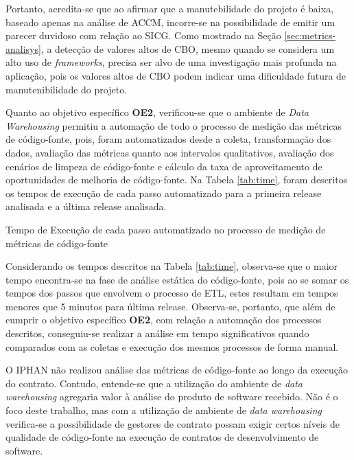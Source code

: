 Portanto, acredita-se que ao afirmar que a manutebilidade do projeto é baixa, baseado apenas na análise de ACCM, incorre-se na possibilidade de emitir um parecer duvidoso com relação ao SICG. Como mostrado na Seção \ref{sec:metrics-analisys}, a detecção de valores altos de CBO, mesmo quando se considera um alto uso de \textit{frameworks}, precisa ser alvo de uma investigação mais profunda na aplicação, pois os valores altos de CBO podem indicar uma dificuldade futura de manutenibilidade do projeto.

Quanto ao objetivo específico \textbf{OE2}, verificou-se que o ambiente de \textit{Data Warehousing} permitiu a automação de todo o processo de medição das métricas de código-fonte, pois, foram automatizados desde a coleta, transformação dos dados, avaliação das métricas quanto aos intervalos qualitativos, avaliação dos cenários de limpeza de código-fonte e cálculo da taxa de aproveitamento de oportunidades de melhoria de código-fonte. Na Tabela \ref{tab:time}, foram descritos os tempos de execução de cada passo automatizado para a primeira release analisada e a última release analisada.

\begin{table}[!ht]
\centering

\caption{Tempo de Execução de cada passo automatizado no processo de medição de métricas de código-fonte}
\label{tab:time}
\end{table}
\FloatBarrier

Considerando os tempos descritos na Tabela \ref{tab:time}, observa-se que o maior tempo encontra-se na fase de análise estática do código-fonte, pois ao se somar os tempos dos passos que envolvem o processo de ETL, estes resultam em tempos menores que 5 minutos para última release. Observa-se, portanto, que além de cumprir o objetivo específico \textbf{OE2}, com relação a automação dos processos descritos, conseguiu-se realizar a análise em tempo significativos quando comparados com as coletas e execução dos mesmos processos de forma manual.

O IPHAN não realizou análise das métricas de código-fonte ao longo da execução do contrato. Contudo, entende-se que a utilização do ambiente de \textit{data warehousing} agregaria valor à análise do produto de software recebido. Não é o foco deste trabalho, mas com a utilização de ambiente de \textit{data warehousing} verifica-se a possibilidade de gestores de contrato possam exigir certos níveis de qualidade de código-fonte na execução de contratos de desenvolvimento de software.  

